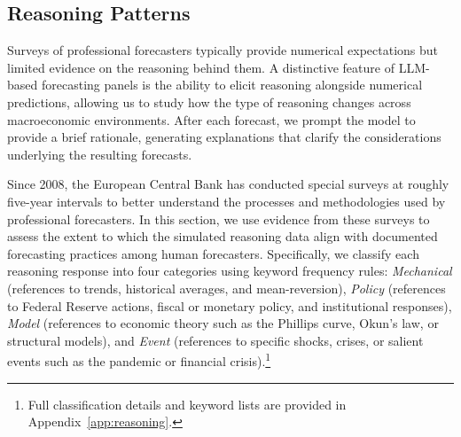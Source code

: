 \documentclass[11pt,letterpaper]{scrartcl}
\begin{document}

\subsection{Reasoning Patterns}\label{sec:reasoning}

Surveys of professional forecasters typically provide numerical expectations but limited evidence on the reasoning behind them.  
A distinctive feature of LLM-based forecasting panels is the ability to elicit reasoning alongside numerical predictions, allowing us to study how the type of reasoning changes across macroeconomic environments. After each forecast, we prompt the model to provide a brief rationale, generating explanations that clarify the considerations underlying the resulting forecasts. 

Since 2008, the European Central Bank has conducted special surveys at roughly five-year intervals to better understand the processes and methodologies used by professional forecasters. In this section, we use evidence from these surveys to assess the extent to which the simulated reasoning data align with documented forecasting practices among human forecasters.
Specifically, we classify each reasoning response into four categories using keyword frequency rules: \textit{Mechanical} (references to trends, historical averages, and mean-reversion), \textit{Policy} (references to Federal Reserve actions, fiscal or monetary policy, and institutional responses), \textit{Model} (references to economic theory such as the Phillips curve, Okun's law, or structural models), and \textit{Event} (references to specific shocks, crises, or salient events such as the pandemic or financial crisis).\footnote{Full classification details and keyword lists are provided in Appendix~\ref{app:reasoning}.}
\end{document}
